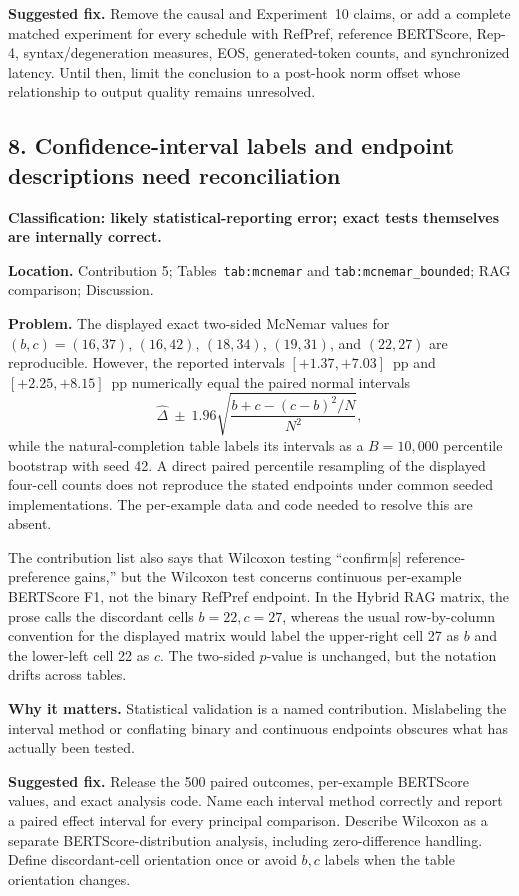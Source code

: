 \documentclass[11pt]{article}
\begin{document}
\textbf{Suggested fix.} Remove the causal and Experiment~10 claims, or add a complete matched experiment for every schedule with RefPref, reference BERTScore, Rep-4, syntax/degeneration measures, EOS, generated-token counts, and synchronized latency.  Until then, limit the conclusion to a post-hook norm offset whose relationship to output quality remains unresolved.

\subsection*{8. Confidence-interval labels and endpoint descriptions need reconciliation}

\textbf{Classification: likely statistical-reporting error; exact tests themselves are internally correct.}

\textbf{Location.} Contribution 5; Tables~\texttt{tab:mcnemar} and \texttt{tab:mcnemar\_bounded}; RAG comparison; Discussion.

\textbf{Problem.} The displayed exact two-sided McNemar values for $(b,c)=(16,37)$, $(16,42)$, $(18,34)$, $(19,31)$, and $(22,27)$ are reproducible.  However, the reported intervals $[+1.37,+7.03]$~pp and $[+2.25,+8.15]$~pp numerically equal the paired normal intervals
\[
\widehat\Delta\ \pm\ 1.96\sqrt{\frac{b+c-(c-b)^2/N}{N^2}},
\]
while the natural-completion table labels its intervals as a $B=10{,}000$ percentile bootstrap with seed 42.  A direct paired percentile resampling of the displayed four-cell counts does not reproduce the stated endpoints under common seeded implementations.  The per-example data and code needed to resolve this are absent.

The contribution list also says that Wilcoxon testing ``confirm[s] reference-preference gains,'' but the Wilcoxon test concerns continuous per-example BERTScore F1, not the binary RefPref endpoint.  In the Hybrid RAG matrix, the prose calls the discordant cells $b=22,c=27$, whereas the usual row-by-column convention for the displayed matrix would label the upper-right cell 27 as $b$ and the lower-left cell 22 as $c$.  The two-sided $p$-value is unchanged, but the notation drifts across tables.

\textbf{Why it matters.} Statistical validation is a named contribution.  Mislabeling the interval method or conflating binary and continuous endpoints obscures what has actually been tested.

\textbf{Suggested fix.} Release the 500 paired outcomes, per-example BERTScore values, and exact analysis code.  Name each interval method correctly and report a paired effect interval for every principal comparison.  Describe Wilcoxon as a separate BERTScore-distribution analysis, including zero-difference handling.  Define discordant-cell orientation once or avoid $b,c$ labels when the table orientation changes.
\end{document}
